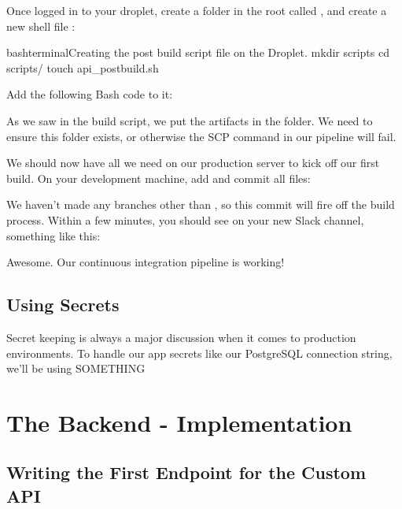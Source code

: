 \documentclass[paper=6in:9in,pagesize=pdftex,headinclude=on,footinclude=on,12pt,twoside]{scrbook}
\begin{document}

Once logged in to your droplet, create a folder in the root called , and create a new shell file : 

\begin{codeInput}{bash}{terminal}{Creating the post build script file on the Droplet.}
mkdir scripts
cd scripts/
touch api_postbuild.sh
\end{codeInput}

Add the following Bash code to it:



As we saw in the build script, we put the artifacts in the  folder. We need to ensure this folder exists, or otherwise the SCP command in our pipeline will fail.


We should now have all we need on our production server to kick off our first build. On your development machine, add and commit all files:

We haven't made any branches other than , so this commit will fire off the build process. Within a few minutes, you should see on your new Slack channel, something like this:



Awesome. Our continuous integration pipeline is working!

\section{Using Secrets}

Secret keeping is always a major discussion when it comes to production environments. To handle our app secrets like our PostgreSQL connection string, we'll be using SOMETHING

\chapter{The Backend - Implementation}

\section{Writing the First Endpoint for the Custom API}
\end{document}
